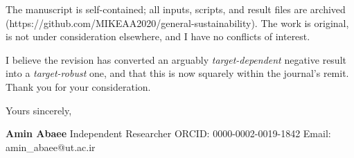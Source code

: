 \documentclass[11pt]{article}
\begin{document}
The manuscript is self-contained; all inputs, scripts, and result files
are archived (https://github.com/MIKEAA2020/general-sustainability). The
work is original, is not under consideration elsewhere, and I have no
conflicts of interest.

I believe the revision has converted an arguably \emph{target-dependent}
negative result into a \emph{target-robust} one, and that this is now
squarely within the journal's remit. Thank you for your consideration.

Yours sincerely,

\textbf{Amin Abaee} Independent Researcher ORCID: 0000-0002-0019-1842
Email: amin\_abaee@ut.ac.ir
\end{document}
